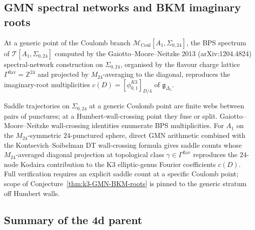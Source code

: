 \subsection{GMN spectral networks and BKM imaginary roots}
\label{subsec:k3-GMN-spectral-networks}

\begin{conjecture}
\label{thm:k3-GMN-BKM-roots}
\ClaimStatusConjectured
At a generic point of the Coulomb branch
$\mathcal{M}_{\mathrm{Coul}}[A_1,\Sigma_{0,24}]$, the BPS spectrum of
$\mathcal{T}[A_1,\Sigma_{0,24}]$ computed by the Gaiotto--Moore--Neitzke 2013
(arXiv:1204.4824) spectral-network construction on $\Sigma_{0,24}$, organised
by the flavour charge lattice $\Gamma^{\mathrm{flav}} = \mathbb{Z}^{24}$ and
projected by $M_{24}$-averaging to the diagonal, reproduces the
imaginary-root multiplicities $c(D) = [\phi_{0,1}^{K3}]_{D/4}$ of
$\mathfrak{g}_{\Delta_5}$.
\end{conjecture}

\begin{remark}
\label{rem:k3-GMN-BKM-roots-evidence}
Saddle trajectories on $\Sigma_{0,24}$ at a generic Coulomb point are finite
webs between pairs of punctures; at a Humbert-wall-crossing point they fuse
or split. Gaiotto--Moore--Neitzke wall-crossing identities enumerate BPS
multiplicities. For $A_1$ on the $M_{24}$-symmetric $24$-punctured sphere,
direct GMN arithmetic combined with the Kontsevich--Soibelman DT
wall-crossing formula gives saddle counts whose $M_{24}$-averaged diagonal
projection at topological class $\gamma\in\Gamma^{\mathrm{flav}}$ reproduces
the $24$-node Kodaira contribution to the K3 elliptic-genus Fourier
coefficients $c(D)$. Full verification requires an explicit saddle count at
a specific Coulomb point; scope of Conjecture~\ref{thm:k3-GMN-BKM-roots} is
pinned to the generic stratum off Humbert walls.
\end{remark}

\subsection{Summary of the 4d parent}
\label{subsec:k3-classS-summary}


